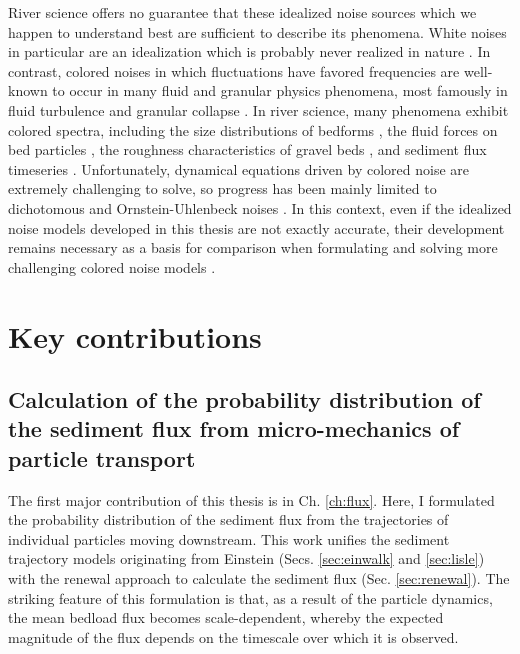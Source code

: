 River science offers no guarantee that these idealized noise sources which we happen to understand best are sufficient to describe its phenomena.
White noises in particular are an idealization which is probably never realized in nature \citep{Gardiner1983,Kubo1978}.
In contrast, colored noises in which fluctuations have favored frequencies are well-known to occur in many fluid and granular physics phenomena, most famously in fluid turbulence \citep{Kolmogorov1941,Nikora2000} and granular collapse \citep{Bak1987,Jensen1998}.
In river science, many phenomena exhibit colored spectra, including the size distributions of bedforms \citep{Nikora1997,Guala2014}, the fluid forces on bed particles \citep{Dwivedi2011, Amir2014}, the roughness characteristics of gravel beds \citep{Aberle2006,Singh2012}, and sediment flux timeseries \citep{Dhont2018,Chartrand2021}.
Unfortunately, dynamical equations driven by colored noise are extremely challenging to solve, so progress has been mainly limited to dichotomous and Ornstein-Uhlenbeck noises \citep{Hanggi1978,Luczka2005,Hanggi2007}. 
In this context, even if the idealized noise models developed in this thesis are not exactly accurate, their development remains necessary as a basis for comparison when formulating and solving more challenging colored noise models \citep[e.g.][]{Fox1986,Moss1989}.

\section{Key contributions}

\subsection{Calculation of the probability distribution of the sediment flux from micro-mechanics of particle transport}

The first major contribution of this thesis is in Ch. \ref{ch:flux}. Here, I formulated the probability distribution of the sediment flux from the trajectories of individual particles moving downstream. This work unifies the sediment trajectory models originating from Einstein (Secs. \ref{sec:einwalk} and \ref{sec:lisle}) with the renewal approach to calculate the sediment flux (Sec. \ref{sec:renewal}).
The striking feature of this formulation is that, as a result of the particle dynamics, the mean bedload flux becomes scale-dependent, whereby the expected magnitude of the flux depends on the timescale over which it is observed.

